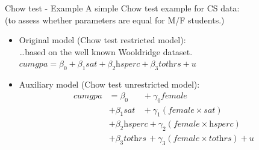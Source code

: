 \documentclass{beamer}
\begin{document}
\begin{frame}{Chow test - Example}
A simple Chow test example for CS data: 
\\(to assess whether parameters are equal for M/F students.)
\vspace{0.3cm}
\begin{itemize}

\item Original model (Chow test restricted model):
\\ \dots based on the well known Wooldridge dataset.
\vspace{0.3cm}
\\ $ \textit{cumgpa} = \beta_0 + \beta_1 \textit{sat} 
     + \beta_2\textit{hsperc}+ \beta_3 \textit{tothrs} + u $

\vspace{0.3cm}
\item Auxiliary model (Chow test unrestricted model):
\begin{equation}
\begin{aligned} 
   \textit{cumgpa} &= \beta_0  ~~~~~~~\,+\gamma_0 \textit{female}  \\
   &+ \beta_1\textit{sat} ~~~~+ \gamma_1 (\textit{female} \! \times \! \textit{sat} ) \\
   &+ \beta_2\textit{hsperc} + \gamma_2 (\textit{female} \! \times \! \textit{hsperc} ) \\ 
   &+ \beta_3 \textit{tothrs} \,+ \gamma_3(\textit{female} \! \times \! \textit{tothrs} ) + u \nonumber
\end{aligned}
\end{equation}
\end{itemize}

\end{frame}

\end{document}
